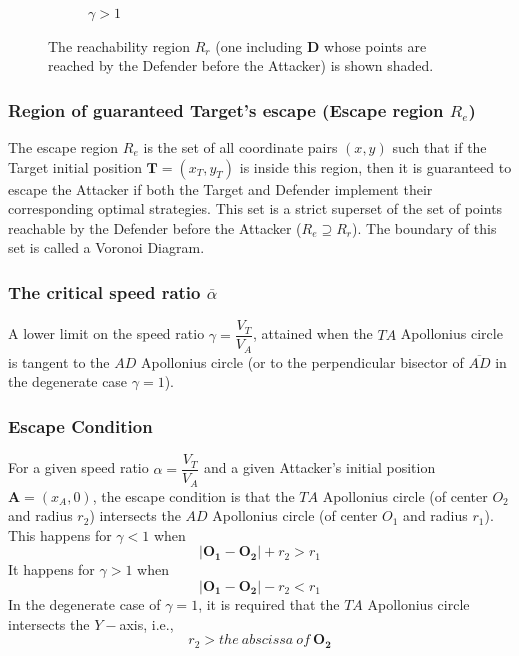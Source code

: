 \documentclass[final,5p,times,twocolumn]{elsarticle}
\begin{document}
\begin{figure}
\begin{subfigure}[htb]{0.3\textwidth}
\caption {$\gamma>1$}
\label{2_g>1}
\end{subfigure}
\caption{The reachability region $R_r$ (one including $\boldsymbol{D}$ whose points are reached by the Defender before the Attacker) is shown shaded.}
\label{Rr2}
\end{figure}

\subsubsection{Region of guaranteed Target's escape (Escape region $R_e$)}
The escape region $R_e$ is the set of all coordinate pairs $(x,y)$ such that if the Target initial position $\boldsymbol{T}=(x_{T},y_{T})$ is inside this region, then it is guaranteed to escape the Attacker if both the Target and Defender implement their corresponding optimal strategies. This set is a strict superset of the set of points reachable by the Defender before the Attacker ($R_e\supseteq R_r$). The boundary of this set is called a Voronoi Diagram.

\subsubsection{The critical speed ratio $\overline{\alpha}$}
A lower limit on the speed ratio $\gamma=\dfrac{V_{T}}{V_{A}}$, attained when the $TA$ Apollonius circle is tangent to the $AD$ Apollonius circle (or to the perpendicular bisector of $\overline{AD}$ in the degenerate case $\gamma=1$).   

\subsubsection{Escape Condition}
For a given speed ratio $\alpha=\dfrac{V_{T}}{V_{A}}$ and a given Attacker's initial position $\boldsymbol{A}=(x_{A},0)$, the escape condition is that the $TA$ Apollonius circle (of center $O_2$ and radius $r_2$) intersects the $AD$ Apollonius circle (of center $O_1$ and radius $r_1$). This happens for $\gamma<1$ when
\begin{equation}
\lvert \boldsymbol{O_{1}}-\boldsymbol{O_{2}}\rvert+r_{2}>r_{1}
\end{equation}
It happens for $\gamma>1$ when
\begin{equation}
\lvert \boldsymbol{O_{1}}-\boldsymbol{O_{2}}\rvert-r_{2}<r_{1}
\end{equation}
In the degenerate case of $\gamma=1$, it is required that the $TA$ Apollonius circle intersects the $Y-$axis, i.e., 
\begin{equation}
r_{2}>the\ abscissa\ of\ \boldsymbol{O_{2}}
\end{equation}
\end{document}
